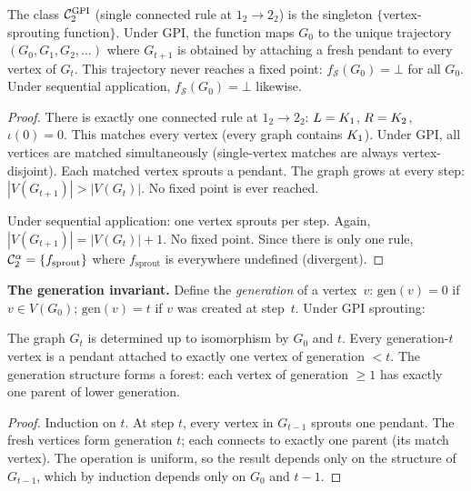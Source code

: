 \documentclass{../shared/primo}
\begin{document}
\begin{theorem}\label{thm:level2}
The class $\mathcal{C}_{2}^{\textup{GPI}}$ (single connected rule at $1_2 \to 2_2$) is the singleton $\{$vertex-sprouting function$\}$. Under GPI, the function maps $G_0$ to the unique trajectory $(G_0, G_1, G_2, \ldots)$ where $G_{t+1}$ is obtained by attaching a fresh pendant to every vertex of $G_t$. This trajectory never reaches a fixed point: $f_\mathcal{S}(G_0) = \bot$ for all $G_0$. Under sequential application, $f_\mathcal{S}(G_0) = \bot$ likewise.
\end{theorem}

\begin{proof}
There is exactly one connected rule at $1_2 \to 2_2$: $L = K_{1}$, $R = K_{2}$, $\iota(0) = 0$. This matches every vertex (every graph contains $K_{1}$). Under GPI, all vertices are matched simultaneously (single-vertex matches are always vertex-disjoint). Each matched vertex sprouts a pendant. The graph grows at every step: $|V(G_{t+1})| > |V(G_t)|$. No fixed point is ever reached.

Under sequential application: one vertex sprouts per step. Again, $|V(G_{t+1})| = |V(G_t)| + 1$. No fixed point. Since there is only one rule, $\mathcal{C}_{2}^{\alpha} = \{f_{\text{sprout}}\}$ where $f_{\text{sprout}}$ is everywhere undefined (divergent).
\end{proof}

\textbf{The generation invariant.} Define the \emph{generation} of a vertex~$v$: $\text{gen}(v) = 0$ if $v \in V(G_0)$; $\text{gen}(v) = t$ if $v$ was created at step~$t$. Under GPI sprouting:

\begin{proposition}\label{prop:structural}
The graph $G_t$ is determined up to isomorphism by $G_0$ and $t$. Every generation-$t$ vertex is a pendant attached to exactly one vertex of generation $< t$. The generation structure forms a forest: each vertex of generation $\geq 1$ has exactly one parent of lower generation.
\end{proposition}

\begin{proof}
Induction on $t$. At step $t$, every vertex in $G_{t-1}$ sprouts one pendant. The fresh vertices form generation $t$; each connects to exactly one parent (its match vertex). The operation is uniform, so the result depends only on the structure of $G_{t-1}$, which by induction depends only on $G_0$ and $t-1$.
\end{proof}
\end{document}
